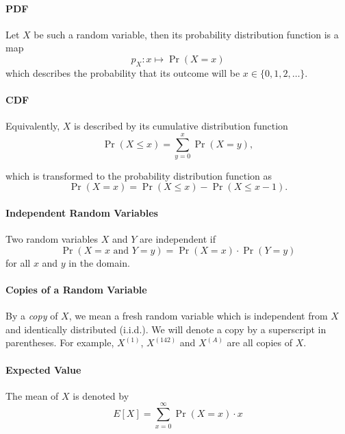 \documentclass{masterthesis}
\begin{document}
\paragraph*{PDF}\label{paragraph:pdf}
Let $X$ be such a random variable, then its probability distribution function is a map
\begin{equation}
    p_X : x \mapsto \Pr(X = x)
\end{equation} 
which describes the probability that its outcome will be $x \in \{0, 1, 2, \ldots \}$.

\paragraph*{CDF}\label{paragraph:cdf}
Equivalently, $X$ is described by its cumulative distribution function
\begin{equation}
    \Pr(X \leq x) = \sum_{y=0}^{x} \Pr(X = y),
\end{equation}

which is transformed to the probability distribution function as 
\begin{equation}
    \Pr(X = x) = \Pr(X \leq x) - \Pr(X \leq x - 1).
\end{equation}

\paragraph*{Independent Random Variables}\label{paragraph:independent_random_variables}
Two random variables $X$ and $Y$ are independent if 
\begin{equation}
    \Pr(X = x \text{ and } Y = y) = \Pr(X = x) \cdot \Pr(Y = y)
\end{equation}
for all $x$ and $y$ in the domain.

\paragraph{Copies of a Random Variable}\label{paragraph:copies_of_a_random_variable} By a \textit{copy} of $X$, we mean a fresh random variable which is independent from $X$ and identically distributed (i.i.d.).
We will denote a copy by a superscript in parentheses. For example, $X^{(1)}$, $X^{(142)}$ and $X^{(A)}$ are all copies of $X$.

\paragraph*{Expected Value}
The mean of $X$ is denoted by 
\begin{equation}\label{eq:expectation}
    E[X] = \sum_{x=0}^{\infty} \Pr(X = x) \cdot x
\end{equation}
\end{document}
